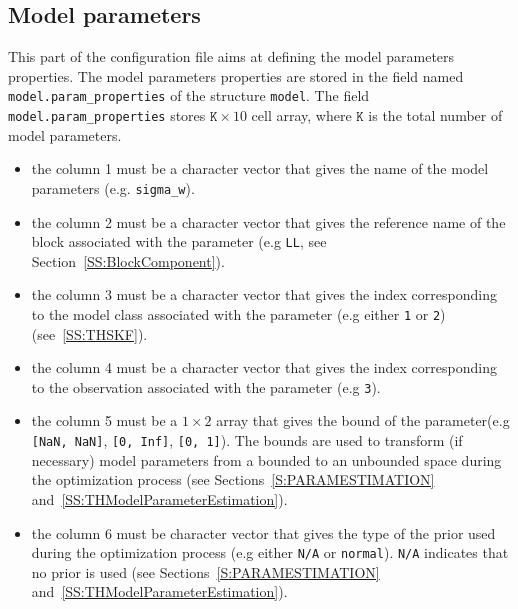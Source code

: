 \subsection{Model parameters}
\label{SS:ModelParamProperties}
This part of the configuration file aims at defining the model parameters properties.
The model parameters properties are stored in the field named \lstinline[basicstyle = \mlttfamily \small ]!model.param_properties! of the \MATLAB{} structure \lstinline[basicstyle = \mlttfamily \small ]!model!.
The field \lstinline[basicstyle = \mlttfamily \small ]!model.param_properties! stores $\mathtt{K} \times 10$ cell array, where $\mathtt{K}$ is the total number of model parameters.
\begin{itemize}
\item the column 1 must be a character vector that gives the name of the model parameters (e.g.  \lstinline[basicstyle = \mlttfamily \small ]!sigma_w!). 
\item the column 2 must be a character vector that gives the reference name of the block associated with the parameter (e.g \lstinline[basicstyle = \mlttfamily \small ]!LL!, see Section~\ref{SS:BlockComponent}).
\item the column 3 must be a character vector that gives the index corresponding to the model class associated with the parameter (e.g  either \lstinline[basicstyle = \mlttfamily \small ]!1! or \lstinline[basicstyle = \mlttfamily \small ]!2!) (see~\ref{SS:THSKF}).
\item the column 4 must be a character vector that gives the index corresponding to the observation associated with the parameter (e.g \lstinline[basicstyle = \mlttfamily \small ]!3!).
\item the column 5 must be a $1\times2$ array that gives the bound of the parameter(e.g \lstinline[basicstyle = \mlttfamily \small ]![NaN, NaN]!,  \lstinline[basicstyle = \mlttfamily \small ]![0, Inf]!, \lstinline[basicstyle = \mlttfamily \small ]![0, 1]!). 
The bounds are used to transform (if necessary) model parameters from a bounded to  an unbounded space during the optimization process (see Sections~\ref{S:PARAMESTIMATION} and~\ref{SS:THModelParameterEstimation}).
\item the column 6 must be character vector that gives the type of the prior used during the optimization process (e.g  either \lstinline[basicstyle = \mlttfamily \small ]!N/A! or \lstinline[basicstyle = \mlttfamily \small ]!normal!). 
\lstinline[basicstyle = \mlttfamily \small ]!N/A! indicates that no prior is used (see Sections~\ref{S:PARAMESTIMATION} and~\ref{SS:THModelParameterEstimation}).

\end{itemize}
